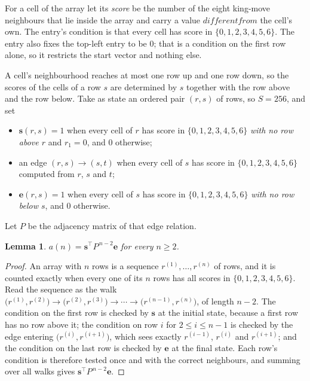 \documentclass[11pt,a4paper]{article}
\theoremstyle{plain}
\newtheorem{lemma}[theorem]{Lemma}
\theoremstyle{definition}
\begin{document}
For a cell of the array let its \emph{score} be the number of the eight king-move neighbours that lie inside
the array and carry a value $different from$ the cell's own. The entry's condition is that every cell
has score in $\{0,1,2,3,4,5,6\}$. The entry also fixes the top-left entry to be $0$; that is a condition on the first row alone, so it restricts the start vector and nothing else.

A cell's neighbourhood reaches at most one row up and one row down, so the scores of the
cells of a row $s$ are determined by $s$ together with the row above and the row below.
Take as state an ordered pair $(r,s)$ of rows, so $S=256$, and set
\begin{itemize}
\item $\mathbf{s}(r,s)=1$ when every cell of $r$ has score in $\{0,1,2,3,4,5,6\}$ \emph{with no row
above $r$} and $r_1=0$, and $0$ otherwise;
\item an edge $(r,s)\to(s,t)$ when every cell of $s$ has score in $\{0,1,2,3,4,5,6\}$ computed from
$r$, $s$ and $t$;
\item $\mathbf{e}(r,s)=1$ when every cell of $s$ has score in $\{0,1,2,3,4,5,6\}$ \emph{with no row
below $s$}, and $0$ otherwise.
\end{itemize}
Let $P$ be the adjacency matrix of that edge relation.

\begin{lemma}\label{lem:walk}
$a(n)=\mathbf{s}^{\!\top}P^{\,n-2}\mathbf{e}$ for every $n\ge2$.
\end{lemma}

\begin{proof}
An array with $n$ rows is a sequence $r^{(1)},\dots,r^{(n)}$ of rows, and it is counted
exactly when every one of its $n$ rows has all scores in $\{0,1,2,3,4,5,6\}$. Read the sequence as the
walk $\bigl(r^{(1)},r^{(2)}\bigr)\to\bigl(r^{(2)},r^{(3)}\bigr)\to\cdots\to
\bigl(r^{(n-1)},r^{(n)}\bigr)$, of length $n-2$. The condition on the first row is
checked by $\mathbf{s}$ at the initial state, because a first row has no row above it; the
condition on row $i$ for $2\le i\le n-1$ is checked by the edge entering
$\bigl(r^{(i)},r^{(i+1)}\bigr)$, which sees exactly $r^{(i-1)}$, $r^{(i)}$ and
$r^{(i+1)}$; and the condition on the last row is checked by $\mathbf{e}$ at the final
state. Each row's condition is therefore tested once and with the correct neighbours, and
summing over all walks gives $\mathbf{s}^{\!\top}P^{\,n-2}\mathbf{e}$.
\end{proof}
\end{document}
